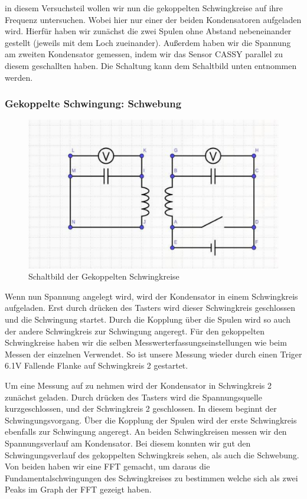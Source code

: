 \documentclass[twoside]{protokoll}
\begin{document}
in diesem Versuchsteil wollen wir nun die gekoppelten Schwingkreise auf ihre Frequenz untersuchen. Wobei hier nur einer der beiden Kondensatoren aufgeladen wird.
Hierfür haben wir zunächst die zwei Spulen ohne Abstand nebeneinander gestellt (jeweils mit dem Loch zueinander). 
Außerdem haben wir die Spannung am zweiten Kondensator gemessen, indem wir das Sensor CASSY parallel zu diesem geschallten haben. 
Die Schaltung kann dem Schaltbild unten entnommen werden. \\



\subsubsection{Gekoppelte Schwingung: Schwebung}

\begin{figure}[H]
    \centering
    \includegraphics[width=1\textwidth]{schaltplan-schwebung.pdf}
    \caption{Schaltbild der Gekoppelten Schwingkreise}
\end{figure}

Wenn nun Spannung angelegt wird, wird der Kondensator in einem Schwingkreis aufgeladen. 
Erst durch drücken des Tasters wird dieser Schwingkreis geschlossen und die Schwingung startet. 
Durch die Kopplung über die Spulen wird so auch der andere Schwingkreis zur Schwingung angeregt.
Für den gekoppelten Schwingkreise haben wir die selben Messwerterfassungseinstellungen wie beim Messen der einzelnen Verwendet. 
So ist unsere Messung wieder durch einen Triger 6.1V Fallende Flanke auf Schwingkreis 2 gestartet.

Um eine Messung auf zu nehmen wird der Kondensator in Schwingkreis 2 zunächst geladen.
Durch drücken des Tasters wird die Spannungsquelle kurzgeschlossen, und der Schwingkreis 2 geschlossen. In diesem beginnt der Schwingungsvorgang.
Über die Kopplung der Spulen wird der erste Schwingkreis ebenfalls zur Schwingung angeregt. An beiden Schwingkreisen messen wir den Spannungsverlauf am Kondensator. 
Bei diesem konnten wir gut den Schwingungsverlauf des gekoppelten Schwingkreis sehen, als auch die Schwebung. 
Von beiden haben wir eine FFT gemacht, um daraus die Fundamentalschwingungen des Schwingkreises zu bestimmen welche sich als zwei Peaks im Graph der FFT gezeigt haben.\\ 
\end{document}
